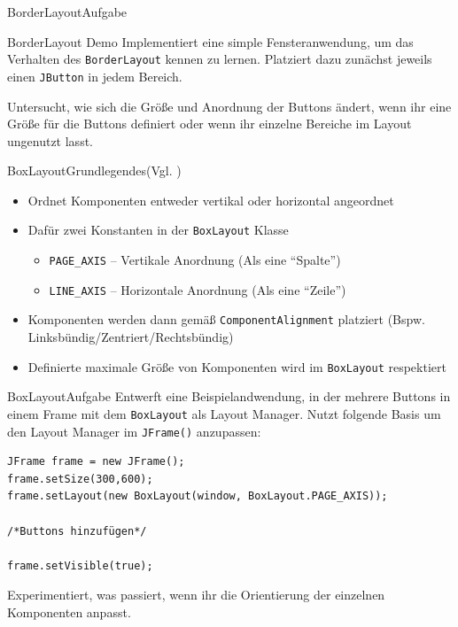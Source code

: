 \begin{frame}{BorderLayout}{Aufgabe}
    \begin{alertblock}{BorderLayout Demo}
    Implementiert eine simple Fensteranwendung, um das Verhalten des \texttt{BorderLayout} kennen zu lernen. Platziert dazu zunächst jeweils einen \texttt{JButton} in
    jedem Bereich. 
    
    Untersucht, wie sich die Größe und Anordnung der Buttons ändert, wenn ihr eine Größe für die Buttons definiert oder wenn ihr einzelne Bereiche im Layout ungenutzt lasst.
    \end{alertblock}
\end{frame}

\begin{frame}{BoxLayout}{Grundlegendes(Vgl. \cite{orac:boxlayout})}
    \begin{itemize}
        \item Ordnet Komponenten entweder vertikal oder horizontal angeordnet
        \item Dafür zwei Konstanten in der \texttt{BoxLayout} Klasse
        \begin{itemize}
            \item \texttt{PAGE_AXIS} -- Vertikale Anordnung (Als eine "`Spalte"')
            \item \texttt{LINE_AXIS} -- Horizontale Anordnung (Als eine "`Zeile"')
        \end{itemize}
        \item Komponenten werden dann gemäß \texttt{ComponentAlignment} platziert (Bspw. Linksbündig/Zentriert/Rechtsbündig)
        \item Definierte maximale Größe von Komponenten wird im \texttt{BoxLayout}  respektiert
    \end{itemize}
\end{frame}

\begin{frame}[fragile]{BoxLayout}{Aufgabe}
Entwerft eine Beispielandwendung, in der mehrere Buttons in einem Frame mit dem \texttt{BoxLayout} als Layout Manager. Nutzt folgende Basis um den Layout Manager im \texttt{JFrame()} anzupassen:

\lstset{style=java}
\begin{lstlisting}
JFrame frame = new JFrame();
frame.setSize(300,600);
frame.setLayout(new BoxLayout(window, BoxLayout.PAGE_AXIS));

/*Buttons hinzufügen*/

frame.setVisible(true);
\end{lstlisting}

Experimentiert, was passiert, wenn ihr die Orientierung der einzelnen Komponenten anpasst.
\end{frame}

